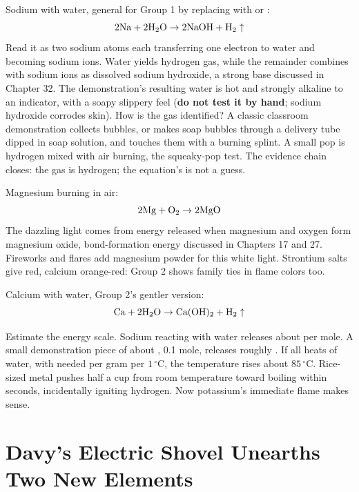 Sodium with water, general for Group 1 by replacing  with  or :
\[\mathrm{2Na} + \mathrm{2H_2O} \rightarrow \mathrm{2NaOH} + \mathrm{H_2}\uparrow\]
Read it as two sodium atoms each transferring one electron to water and becoming sodium ions. Water yields hydrogen gas, while the remainder combines with sodium ions as dissolved sodium hydroxide, a strong base discussed in Chapter 32. The demonstration's resulting water is hot and strongly alkaline to an indicator, with a soapy slippery feel (\textbf{do not test it by hand}; sodium hydroxide corrodes skin). How is the gas identified? A classic classroom demonstration collects bubbles, or makes soap bubbles through a delivery tube dipped in soap solution, and touches them with a burning splint. A small pop is hydrogen mixed with air burning, the squeaky-pop test. The evidence chain closes: the gas is hydrogen; the equation's  is not a guess.

Magnesium burning in air:
\[\mathrm{2Mg} + \mathrm{O_2} \rightarrow \mathrm{2MgO}\]
The dazzling light comes from energy released when magnesium and oxygen form magnesium oxide, bond-formation energy discussed in Chapters 17 and 27. Fireworks and flares add magnesium powder for this white light. Strontium salts give red, calcium orange-red: Group 2 shows family ties in flame colors too.

Calcium with water, Group 2's gentler version:
\[\mathrm{Ca} + \mathrm{2H_2O} \rightarrow \mathrm{Ca(OH)_2} + \mathrm{H_2}\uparrow\]

Estimate the energy scale. Sodium reacting with water releases about  per mole. A small demonstration piece of about , 0.1 mole, releases roughly . If all heats  of water, with  needed per gram per $1\,^{\circ}\mathrm{C}$, the temperature rises about $85\,^{\circ}\mathrm{C}$. Rice-sized metal pushes half a cup from room temperature toward boiling within seconds, incidentally igniting hydrogen. Now potassium's immediate flame makes sense.

\section{Davy's Electric Shovel Unearths Two New Elements}

